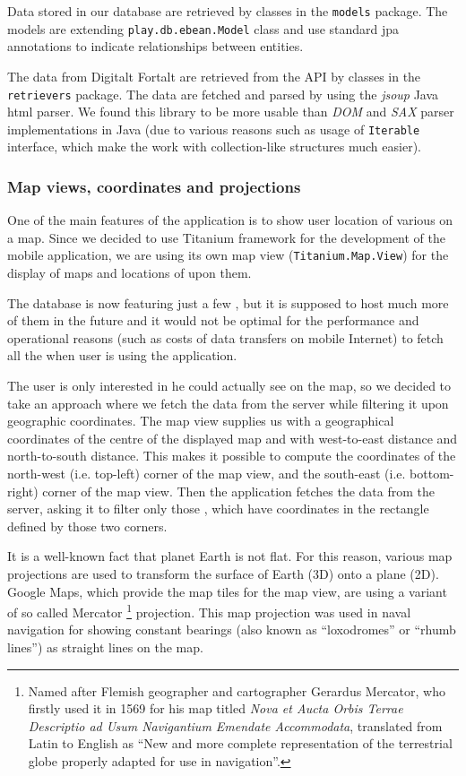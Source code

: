 \documentclass[11pt]{book}
\begin{document}
Data stored in our database are retrieved by classes in the \texttt{models} package. The models are extending \texttt{play.db.ebean.Model} class and use standard \gls{jpa} annotations to indicate relationships between entities.

The data from Digitalt Fortalt are retrieved from the API by classes in the \texttt{retrievers} package. The data are fetched and parsed by using the \emph{jsoup} Java \gls{html} parser. We found this library to be more usable than \emph{DOM} and \emph{SAX} parser implementations in Java (due to various reasons such as usage of \texttt{Iterable} interface, which make the work with collection-like structures much easier).

\subsubsection{Map views, coordinates and projections} \label{sec:spr3_maps}

One of the main features of the application is to show user location of various \wallentityp on a map. Since we decided to use Titanium framework for the development of the mobile application, we are using its own map view (\texttt{Titanium.Map.View}) for the display of maps and locations of \wallentityp upon them.

The database is now featuring just a few \wallentityp, but it is supposed to host much more of them in the future and it would not be optimal for the performance and operational reasons (such as costs of data transfers on mobile Internet) to fetch all the \wallentityp when user is using the application.

The user is only interested in \wallentityp he could actually see on the map, so we decided to take an approach where we fetch the data from the server while filtering it upon geographic coordinates. The map view supplies us with a geographical coordinates of the centre of the displayed map and with west-to-east distance and north-to-south distance. This makes it possible to compute the coordinates of the north-west (i.e. top-left) corner of the map view, and the south-east (i.e. bottom-right) corner of the map view. Then the application fetches the data from the server, asking it to filter only those \wallentityp, which have coordinates in the rectangle defined by those two corners.

It is a well-known fact that planet Earth is not flat. For this reason, various map projections are used to transform the surface of Earth (3D) onto a plane (2D). Google Maps, which provide the map tiles for the map view, are using a variant of so called Mercator \footnote{Named after Flemish geographer and cartographer Gerardus Mercator, who firstly used it in 1569 for his map titled \emph{Nova et Aucta Orbis Terrae Descriptio ad Usum Navigantium Emendate Accommodata}, translated from Latin to English as ``New and more complete representation of the terrestrial globe properly adapted for use in navigation''.} projection. This map projection was used in naval navigation for showing constant bearings (also known as ``loxodromes'' or ``rhumb lines'') as straight lines on the map. \cite{progonos:mercator,radicalcartography}
\end{document}
